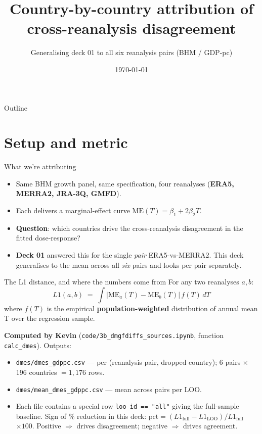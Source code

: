 \documentclass[10pt,aspectratio=169]{beamer}
\title{Country-by-country attribution of cross-reanalysis disagreement}
\subtitle{Generalising deck 01 to all six reanalysis pairs (BHM / GDP-pc)}
\author{}
\date{\today}
\begin{document}
\begin{frame}\titlepage\end{frame}

\begin{frame}{Outline}\tableofcontents\end{frame}

\section{Setup and metric}

\begin{frame}{What we're attributing}
  \begin{itemize}
    \item Same BHM growth panel, same specification, four reanalyses
          (\textbf{ERA5, MERRA2, JRA-3Q, GMFD}).
    \item Each delivers a marginal-effect curve
          $\mathrm{ME}(T) = \beta_1 + 2\beta_2 T$.
    \item \textbf{Question}: which countries drive the cross-reanalysis
          disagreement in the fitted dose-response?
    \item \textbf{Deck 01} answered this for the single \emph{pair}
          ERA5-vs-MERRA2. This deck generalises to the mean across all
          \emph{six} pairs and looks per pair separately.
  \end{itemize}
\end{frame}

\begin{frame}{The L1 distance, and where the numbers come from}
  For any two reanalyses $a, b$:
  \[
    L1(a,b) \;=\; \int \bigl| \mathrm{ME}_a(T) - \mathrm{ME}_b(T)\bigr|\, f(T)\,dT
  \]
  where $f(T)$ is the empirical \textbf{population-weighted} distribution of
  annual mean T over the regression sample.

  \vspace{0.6em}
  \textbf{Computed by Kevin}
  (\texttt{code/3b\_dmgfdiffs\_sources.ipynb}, function \texttt{calc\_dmes}).
  Outputs:
  \begin{itemize}\setlength{\itemsep}{1pt}
    \item \texttt{dmes/dmes\_gdppc.csv} --- per (reanalysis pair, dropped
          country); 6 pairs $\times$ 196 countries $= 1{,}176$ rows.
    \item \texttt{dmes/mean\_dmes\_gdppc.csv} --- mean across pairs per LOO.
    \item Each file contains a special row \texttt{loo\_id == "all"}
          giving the full-sample baseline. Sign of $\%$ reduction in this
          deck:
          $\text{pct} = (L1_\text{full} - L1_\text{LOO}) / L1_\text{full}$
          $\times 100$.
          \textcolor{purpleC}{Positive $\Rightarrow$ drives disagreement};
          \textcolor{greenC}{negative $\Rightarrow$ drives agreement}.
  \end{itemize}
\end{frame}
\end{document}
